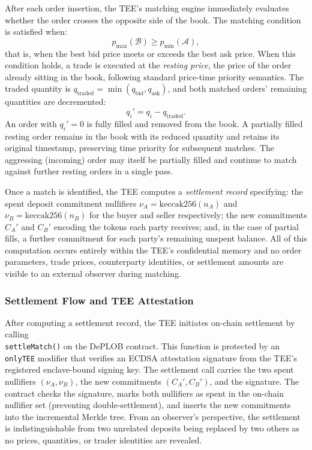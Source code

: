\documentclass[12pt,a4paper]{article}
\begin{document}
After each order insertion, the TEE's matching engine immediately evaluates whether the order crosses the opposite side of the book. The matching condition is satisfied when:
$$
p_{\max}(\mathcal{B}) \geq p_{\min}(\mathcal{A}),
$$
that is, when the best bid price meets or exceeds the best ask price. When this condition holds, a trade is executed at the \textit{resting price}, the price of the order already sitting in the book, following standard price-time priority semantics. The traded quantity is $q_{\text{traded}} = \min(q_{\text{bid}}, q_{\text{ask}})$, and both matched orders' remaining quantities are decremented:
$$
q_i' = q_i - q_{\text{traded}}.
$$
An order with $q_i' = 0$ is fully filled and removed from the book. A partially filled resting order remains in the book with its reduced quantity and retains its original timestamp, preserving time priority for subsequent matches. The aggressing (incoming) order may itself be partially filled and continue to match against further resting orders in a single pass.

Once a match is identified, the TEE computes a \textit{settlement record} specifying: the spent deposit commitment nullifiers $\nu_A = \text{keccak256}(n_A)$ and $\nu_B = \text{keccak256}(n_B)$ for the buyer and seller respectively; the new commitments $C_A' $ and $C_B'$ encoding the tokens each party receives; and, in the case of partial fills, a further commitment for each party's remaining unspent balance. All of this computation occurs entirely within the TEE's confidential memory and no order parameters, trade prices, counterparty identities, or settlement amounts are visible to an external observer during matching.

\subsubsection{Settlement Flow and TEE Attestation}
\label{sec:settlement}

After computing a settlement record, the TEE initiates on-chain settlement by calling \\ \texttt{settleMatch()} on the DePLOB contract. This function is protected by an \texttt{onlyTEE} modifier that verifies an ECDSA attestation signature from the TEE's registered enclave-bound signing key. The settlement call carries the two spent nullifiers $(\nu_A, \nu_B)$, the new commitments $(C_A', C_B')$, and the signature. The contract checks the signature, marks both nullifiers as spent in the on-chain nullifier set (preventing double-settlement), and inserts the new commitments into the incremental Merkle tree. From an observer's perspective, the settlement is indistinguishable from two unrelated deposits being replaced by two others as no prices, quantities, or trader identities are revealed.
\end{document}
